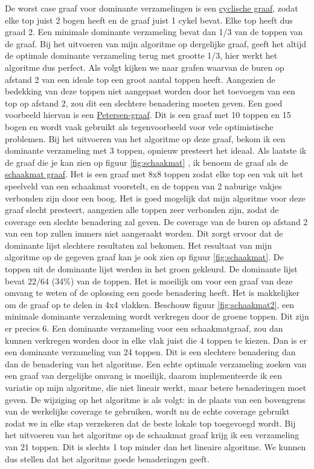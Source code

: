 \documentclass[11pt, a4paper, table]{article}
\theoremstyle{definition}
\begin{document}
De worst case graaf voor dominante verzamelingen is een \underline{cyclische graaf}, zodat elke top juist 2 bogen heeft en de graaf juist 1 cykel bevat. 
Elke top heeft dus graad 2. Een minimale dominante verzameling bevat dan 1/3 van de toppen van de graaf. Bij het uitvoeren van mijn algoritme op dergelijke graaf, geeft het altijd de optimale dominante verzameling terug met grootte 1/3, hier werkt het algoritme dus perfect. 
Als volgt kijken we naar grafen waarvan de buren op afstand 2 van een ideale top een groot aantal toppen heeft. Aangezien de bedekking van deze toppen niet aangepast worden door het toevoegen van een top op afstand 2, zou dit een slechtere benadering moeten geven. Een goed voorbeeld hiervan is een \underline{Petersen-graaf}. Dit is een graaf met 10 toppen en 15 bogen en wordt vaak gebruikt als tegenvoorbeeld voor vele optimistische problemen. Bij het uitvoeren van het algoritme op deze graaf, bekom ik een dominante verzameling met 3 toppen, opnieuw presteert het ideaal. 
Als laatste ik de graaf die je kan zien op figuur \ref{fig:schaakmat}
, ik benoem de graaf als de \underline{schaakmat graaf}. Het is een graaf met 8x8 toppen zodat elke top een vak uit het speelveld van een schaakmat voorstelt, en de toppen van 2 naburige vakjes verbonden zijn door een boog. Het is goed mogelijk dat mijn algoritme voor deze graaf slecht presteert, aangezien alle toppen zeer verbonden zijn, zodat de coverage een slechte benadering zal geven. De coverage van de buren op afstand 2 van een top zullen immers niet aangeraakt worden. Dit zorgt ervoor dat de dominante lijst slechtere resultaten zal bekomen. Het resultaat van mijn algoritme op de gegeven graaf kan je ook zien op figuur \ref{fig:schaakmat}. De toppen uit de dominante lijst werden in het groen gekleurd. De dominante lijst bevat $22/64$ (34\%) van de toppen. Het is moeilijk om voor een graaf van deze omvang te weten of de oplossing een goede benadering heeft. Het is makkelijker om de graaf op te delen in 4x4 vlakken. Beschouw figuur \ref{fig:schaakmat2}, een minimale dominante verzaleming wordt verkregen door de groene toppen. Dit zijn er precies 6. 
Een dominante verzameling voor een schaakmatgraaf, zou dan kunnen verkregen worden door in elke vlak juist die 4 toppen te kiezen. Dan is er een dominante verzameling van 24 toppen. Dit is een slechtere benadering dan dan de benadering van het algoritme. Een echte optimale verzameling zoeken van een graaf van dergelijke omvang is moeilijk, daarom implementeerde ik een variatie op mijn algoritme, die niet lineair werkt, maar betere benaderingen moet geven. De wijziging op het algoritme is als volgt: in de plaats van een bovengrens van de werkelijke coverage te gebruiken, wordt nu de echte coverage gebruikt zodat we in elke stap verzekeren dat de beste lokale top toegevoegd wordt. Bij het uitvoeren van het algoritme op de schaakmat graaf krijg ik een verzameling van 21 toppen. Dit is slechts 1 top minder dan het lineaire algoritme. We kunnen dus stellen dat het algoritme goede benaderingen geeft. 
\end{document}
